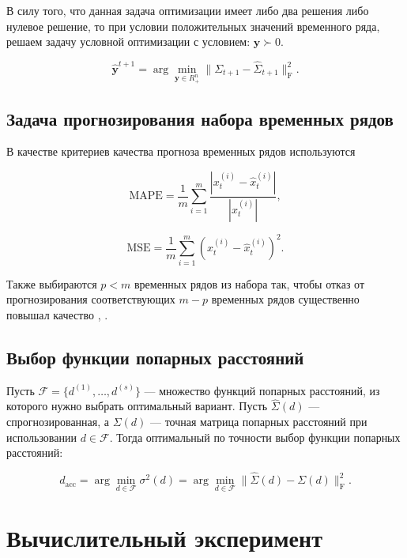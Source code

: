 \documentclass{article}
\begin{document}
В силу того, что данная задача оптимизации имеет либо два решения
либо нулевое решение, то при условии положительных значений временного ряда, решаем задачу условной оптимизации с условием: $\mathbf{y} \succ 0$.

\begin{equation}
    \hat{\mathbf{y}}^{t + 1} = \arg \min \limits_{\mathbf{y} \in R^n_+}\|\Sigma_{t + 1} - \hat{\Sigma}_{t + 1}\|_{\text{F}}^2.
\end{equation}


\subsection{Задача прогнозирования набора временных рядов}

В качестве критериев качества прогноза временных рядов используются 

\begin{equation}
    \text{MAPE} = \frac{1}{m}\sum\limits_{i = 1}^{m}\dfrac{|x^{(i)}_t - \hat{x}^{(i)}_t|}{|x^{(i)}_t|},
\end{equation}

\begin{equation}
    \text{MSE} = \frac{1}{m}\sum\limits_{i = 1}^{m}(x^{(i)}_t - \hat{x}^{(i)}_t)^2.
\end{equation}

Также выбираются $p < m$ временных рядов из набора так, чтобы отказ от прогнозирования соответствующих $m - p$ временных рядов существенно повышал качество , . 

\subsection{Выбор функции попарных расстояний}

Пусть $\mathcal{F} = \{d^{(1)}, \ldots, d^{(s)}\}$ --- множество функций попарных расстояний, из которого нужно выбрать оптимальный вариант. Пусть $\hat{\Sigma}(d)$ --- спрогнозированная, а $\Sigma(d)$ --- точная матрица попарных расстояний при использовании $d \in \mathcal{F}$. Тогда оптимальный по точности выбор функции попарных расстояний:

\begin{equation}
    d_{\text{acc}} = \arg\min\limits_{d \in \mathcal{F}} \sigma^2(d) = \arg\min\limits_{d \in \mathcal{F}} \|\hat{\Sigma}(d) - \Sigma(d)\|_{\text{F}}^2.
\end{equation}


\section{Вычислительный эксперимент}
\end{document}
